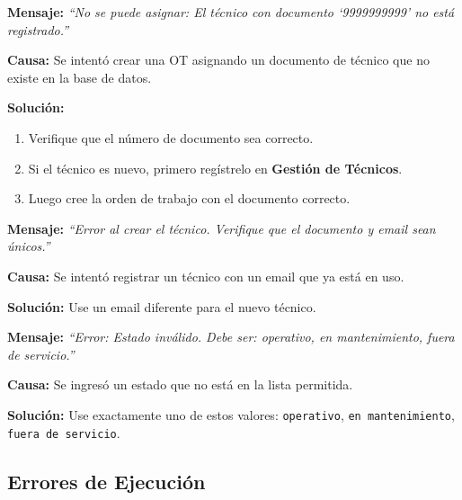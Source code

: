 \documentclass[12pt, a4paper]{article}
\begin{document}
\vspace{0.5cm}

\begin{errorbox}
\textbf{Mensaje:} \textit{``No se puede asignar: El t\'ecnico con documento `9999999999' no est\'a registrado.''}

\textbf{Causa:} Se intent\'o crear una OT asignando un documento de t\'ecnico que no existe en la base de datos.

\textbf{Soluci\'on:}
\begin{enumerate}
    \item Verifique que el n\'umero de documento sea correcto.
    \item Si el t\'ecnico es nuevo, primero reg\'istrelo en \textbf{Gesti\'on de T\'ecnicos}.
    \item Luego cree la orden de trabajo con el documento correcto.
\end{enumerate}
\end{errorbox}

\vspace{0.5cm}

\begin{errorbox}
\textbf{Mensaje:} \textit{``Error al crear el t\'ecnico. Verifique que el documento y email sean \'unicos.''}

\textbf{Causa:} Se intent\'o registrar un t\'ecnico con un email que ya est\'a en uso.

\textbf{Soluci\'on:} Use un email diferente para el nuevo t\'ecnico.
\end{errorbox}

\vspace{0.5cm}

\begin{errorbox}
\textbf{Mensaje:} \textit{``Error: Estado inv\'alido. Debe ser: operativo, en mantenimiento, fuera de servicio.''}

\textbf{Causa:} Se ingres\'o un estado que no est\'a en la lista permitida.

\textbf{Soluci\'on:} Use exactamente uno de estos valores: \texttt{operativo}, \texttt{en mantenimiento}, \texttt{fuera de servicio}.
\end{errorbox}

\subsection{Errores de Ejecuci\'on}
\end{document}
